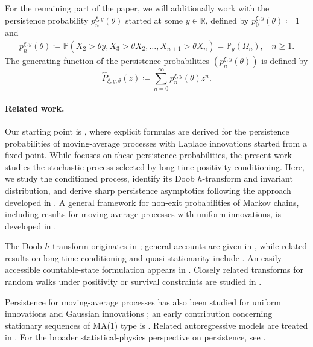 \documentclass[12pt]{article}
\newcommand{\R}{\mathbb{R}} %
\renewcommand{\P}{\mathbb{P}} %
\newcommand{\1}{\mathds{1}}
\theoremstyle{definition}
\theoremstyle{plain}
\theoremstyle{remark}
\begin{document}
For the remaining part of the paper, we will additionally work with the persistence probability $ p_n^{\xi,y}(\theta)$ started at some $y\in\R$, defined by $p_0^{\xi,y}(\theta)\coloneqq 1$ and
\begin{align*}
    p_n^{\xi,y}(\theta)\coloneqq \P(X_2>\theta y,X_3>\theta X_2,\dots,X_{n+1}>\theta X_{n})=\P_y(\Omega_n),~~~~n\ge 1.
\end{align*}
The generating function of the persistence probabilities  $(p_n^{\xi,y}(\theta))$ is defined by $$\hat{P}_{\xi,y,\theta}(z)\coloneqq \sum_{n=0}^\infty p_n^{\xi,y}(\theta)z^n.$$
\paragraph{Related work.}
Our starting point is \cite{AR}, where explicit formulas are derived for the persistence probabilities of moving-average processes with Laplace innovations started from a fixed point. While \cite{AR} focuses on these persistence probabilities, the present work studies the stochastic process selected by long-time positivity conditioning. Here, we study the conditioned process, identify its Doob $h$-transform and invariant distribution, and derive sharp persistence asymptotics following the approach developed in \cite{AW}. A general framework for non-exit probabilities of Markov chains, including results for moving-average processes with uniform innovations, is developed in \cite{AMZ}.

The Doob $h$-transform originates in \cite{doob}; general accounts are given in \cite{RogersWilliams1,RogersWilliams2}, while related results on long-time conditioning and quasi-stationarity include \cite{ChampagnatVillemonais2016,ColletMartinezSanMartin,SenetaVereJones}. An easily accessible countable-state formulation appears in \cite[Theorem 2.11]{Swart}. Closely related transforms for random walks under positivity or survival constraints are studied in \cite{BertoinDoney,Caravenna2005,CaravennaChaumont2008,CaravennaChaumont2013,Wachtel1,Wachtel4,Wachtel6,Wachtel7,Wachtel5,Wachtel2,Wachtel3,EichelsbacherKonig}.

Persistence for moving-average processes has also been studied for uniform innovations \cite{AurzadaRaschel} and Gaussian innovations \cite{2,12}; an early contribution concerning stationary sequences of MA(1) type is \cite{15}. Related autoregressive models are treated in \cite{1,3,5,9,DonnartSimon,11,14}. For the broader statistical-physics perspective on persistence, see \cite{8}.
\end{document}
